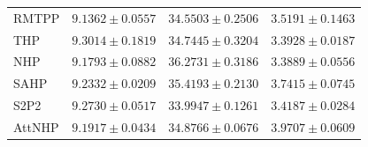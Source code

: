 \begin{table}[t]
\begin{tabular}{@{}lrrr@{}}
RMTPP & $\mathbf{9.1362\pm0.0557}$ & $34.5503\pm0.2506$ & $3.5191\pm0.1463$\\
THP & $9.3014\pm0.1819$ & $34.7445\pm0.3204$ & $3.3928\pm0.0187$\\
NHP & $9.1793\pm0.0882$ & $36.2731\pm0.3186$ & $\mathbf{3.3889\pm0.0556}$\\
SAHP & $9.2332\pm0.0209$ & $35.4193\pm0.2130$ & $3.7415\pm0.0745$\\
S2P2 & $9.2730\pm0.0517$ & $\mathbf{33.9947\pm0.1261}$ & $3.4187\pm0.0284$\\
AttNHP & $9.1917\pm0.0434$ & $34.8766\pm0.0676$ & $3.9707\pm0.0609$\\
\bottomrule
\end{tabular}
\end{table}
